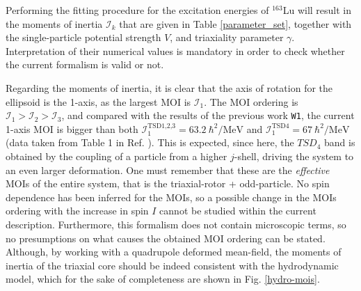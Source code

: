 \documentclass[myclassdoc,debug]{rjparticle}
\begin{document}
Performing the fitting procedure for the excitation energies of $^{163}$Lu will result in the moments of inertia $\mathcal{I}_k$ that are given in Table \ref{parameter_set}, together with the single-particle potential strength $V$, and triaxiality parameter $\gamma$. Interpretation of their numerical values is mandatory in order to check whether the current formalism is valid or not.

Regarding the moments of inertia, it is clear that the axis of rotation for the ellipsoid is the 1-axis, as the largest MOI is $\mathcal{I}_1$. The MOI ordering is $\mathcal{I}_1>\mathcal{I}_2>\mathcal{I}_3$, and compared with the results of the previous work \texttt{W1}, the current 1-axis MOI is bigger than both $\mathcal{I}_1^\text{TSD1,2,3}=63.2\ \hbar^2/\text{MeV}$ and $\mathcal{I}_1^\text{TSD4}=67\ \hbar^2/\text{MeV}$ (data taken from Table 1 in Ref. \cite{raduta2020towards}). This is expected, since here, the $TSD_4$ band is obtained by the coupling of a particle from a higher $j$-shell, driving the system to an even larger deformation. One must remember that these are the \emph{effective} MOIs of the entire system, that is the triaxial-rotor + odd-particle. No spin dependence has been inferred for the MOIs, so a possible change in the MOIs ordering with the increase in spin $I$ cannot be studied within the current description. Furthermore, this formalism does not contain microscopic terms, so no presumptions on what causes the obtained MOI ordering can be stated. Although, by working with a quadrupole deformed mean-field, the moments of inertia of the triaxial core should be indeed consistent with the hydrodynamic model, which for the sake of completeness are shown in Fig. \ref{hydro-mois}.
\end{document}
